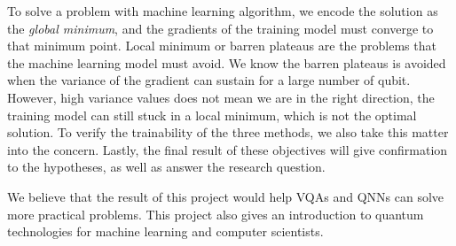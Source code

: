 To solve a problem with machine learning algorithm, we encode the solution as the \textit{global minimum}, and the gradients of the training model must converge to that minimum point.
Local minimum or barren plateaus are the problems that the machine learning model must avoid.
We know the barren plateaus is avoided when the variance of the gradient can sustain for a large number of qubit.
However, high variance values does not mean we are in the right direction, the training model can still stuck in a local minimum, which is not the optimal solution.
To verify the trainability of the three methods, we also take this matter into the concern.
Lastly, the final result of these objectives will give confirmation to the hypotheses, as well as answer the research question.

We believe that the result of this project would help VQAs and QNNs can solve more practical problems. 
This project also gives an introduction to quantum technologies for machine learning and computer scientists.
